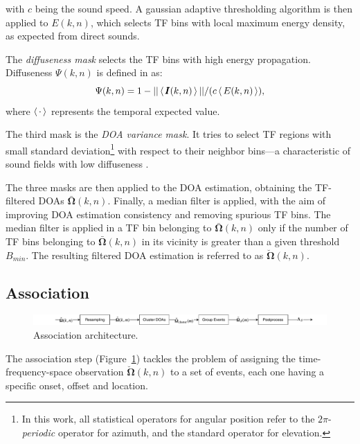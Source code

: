 with $c$ being the sound speed. A gaussian adaptive thresholding algorithm is then applied to $E(k,n)$, which selects TF bins with local maximum energy density, as expected from direct sounds.

The \textit{diffuseness mask} selects the TF bins with high energy propagation. Diffuseness $\Psi(k,n)$ is defined in \cite{merimaa2005spatial} as:
\begin{equation}
    \Psi(k,n) = 1 - ||\operatorname{\langle} \pmb{I}(k,n) \operatorname{\rangle}|| / (c \operatorname{\langle} E(k,n) \operatorname{\rangle}),
    \label{psi}
\end{equation}
where $\operatorname{\langle} \cdot \operatorname{\rangle}$ represents the temporal expected value.

The third mask is the \textit{DOA variance mask}. It tries to select TF regions with small standard deviation\footnote{In this work, all statistical operators for angular position refer to the $2\pi$-\textit{periodic} operator for azimuth, and the standard operator for elevation.} with respect to their neighbor bins---a characteristic of sound fields with low diffuseness \cite{pulkki2018parametric}.

The three masks are then applied to the DOA estimation, obtaining the TF-filtered DOAs $\bar{\pmb{\Omega}}(k,n)$. Finally, a median filter is applied, with the aim of improving DOA estimation consistency and removing spurious TF bins.
The median filter is applied in a TF bin belonging to $\bar{\pmb{\Omega}}(k,n)$ only if the number of TF bins belonging to $\bar{\pmb{\Omega}}(k,n)$  in its vicinity is greater than a given threshold $B_{min}$.
The resulting filtered DOA estimation is referred to as $\breve{\pmb{\Omega}}(k,n)$.


\subsection{Association}
\label{ssec:association}

\begin{figure}[h]
    \includegraphics[width=\textwidth]{Figures/SELD//ASS.pdf}
    \caption{Association architecture.}
    \label{fig:association}

\end{figure}

The association step (Figure~\ref{fig:association}) tackles the problem of assigning the time-frequency-space observation $\breve{\pmb{\Omega}}(k,n)$ to a set of events, each one having a specific onset, offset  and location. 

